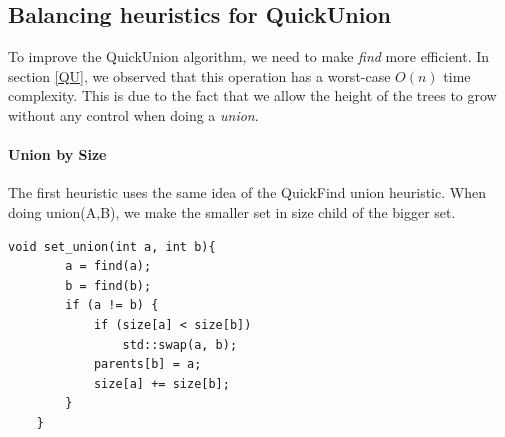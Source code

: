 \documentclass{article}
\begin{document}
\subsection{Balancing heuristics for QuickUnion}
To improve the QuickUnion algorithm, we need to make \emph{find} more efficient.
In section \ref{QU}, we observed that this operation has a worst-case $O(n)$ time complexity.
This is due to the fact that we allow the height of the trees to grow without any control when 
doing a \emph{union}. 
\paragraph{Union by Size}
The first heuristic uses the same idea of the QuickFind union heuristic. When doing union(A,B),
we make the smaller set in size child of the bigger set.
\begin{lstlisting}[caption=Union by size implementation, label=quu]
    void set_union(int a, int b){
        a = find(a);
        b = find(b);
        if (a != b) {
            if (size[a] < size[b])
                std::swap(a, b);
            parents[b] = a;
            size[a] += size[b];
        }
    }

\end{lstlisting}
\end{document}
